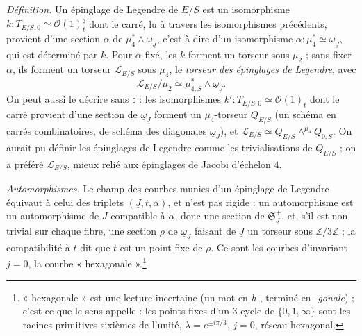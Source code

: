 \documentclass[11pt,a4paper]{article}
\begin{document}
\emph{Définition.} Un épinglage de Legendre de $E/S$ est un isomorphisme $k :
T_{E/S,0} \simeq \mathcal{O}(1)^{\natural}_t$ dont le carré, lu à travers les
isomorphismes précédents, provient d'une section $\alpha$ de $\mu_4^{*} \wedge
\underline{\omega}_{\underline{J}}$, c'est-à-dire d'un isomorphisme $\alpha :
\mu_4^{*} \simeq \underline{\omega}_{\underline{J}}$, qui est déterminé par
$k$. Pour $\alpha$ fixé, les $k$ forment un torseur sous $\mu_2$ ; sans fixer
$\alpha$, ils forment un torseur $\mathcal{L}_{E/S}$ sous $\mu_4$, le
\emph{torseur des épinglages de Legendre}, avec
\[
\mathcal{L}_{E/S} / \mu_2 \simeq \mu^{*}_{4,S} \wedge
\underline{\omega}_{\underline{J}} .
\]
On peut aussi le décrire sans $\natural$ : les isomorphismes $k' : T_{E/S,0}
\simeq \mathcal{O}(1)_t$ dont le carré provient d'une section de
$\underline{\omega}_{\underline{J}}$ forment un $\mu_4$-torseur $Q_{E/S}$ (un
schéma en carrés combinatoires, de schéma des diagonales
$\underline{\omega}_{\underline{J}}$), et $\mathcal{L}_{E/S} \simeq Q_{E/S}
\wedge^{\mu_4} Q_{0,S}$. On aurait pu définir les épinglages de Legendre comme
les trivialisations de $Q_{E/S}$ ; on a préféré $\mathcal{L}_{E/S}$, mieux relié
aux épinglages de Jacobi d'échelon $4$.

\emph{Automorphismes.} Le champ des courbes munies d'un épinglage de Legendre
équivaut à celui des triplets $(\underline{J}, t, \alpha)$, et n'est pas rigide :
un automorphisme est un automorphisme de $\underline{J}$ compatible à $\alpha$,
donc une section de $\mathfrak{S}^{+}_{\underline{J}}$, et, s'il est non trivial
sur chaque fibre, une section $\rho$ de $\underline{\omega}_{\underline{J}}$
faisant de $\underline{J}$ un torseur sous $\mathbb{Z}/3\mathbb{Z}$ ; la
compatibilité à $t$ dit que $t$ est un point fixe de $\rho$. Ce sont les courbes
d'invariant $j = 0$, la courbe « hexagonale ».\footnote{« hexagonale » est une
lecture incertaine (un mot en \emph{h-}, terminé en \emph{-gonale}) ; c'est ce
que le sens appelle : les points fixes d'un $3$-cycle de $\{0, 1, \infty\}$ sont
les racines primitives sixièmes de l'unité, $\lambda = e^{\pm i\pi/3}$, $j = 0$,
réseau hexagonal.}
\end{document}
